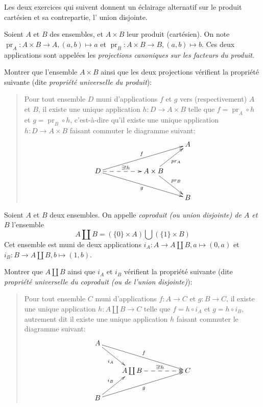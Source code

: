 Les deux exercices qui suivent donnent un éclairage alternatif sur le produit cartésien et sa contrepartie, l' \og union disjointe\fg.

\begin{exercice}
Soient $A$ et $B$ des ensembles, et $ A\times B$ leur produit (cartésien). On note $\operatorname{pr}_A : A\times B \to A, (a,b)\mapsto a$ et $\operatorname{pr}_B : A\times B \to B, (a,b)\mapsto b$. Ces deux applications sont appelées les \emph{projections canoniques sur les facteurs du produit}.

Montrer que l'ensemble $A\times B$ ainsi que les deux projections vérifient la propriété suivante (dite \emph{propriété universelle du produit}):
\begin{quote}
Pour tout ensemble $D$ muni d'applications $f$ et $g$ vers (respectivement) $A$ et $B$, il existe une unique application $h : D\to A\times B$ telle que $f =\operatorname{pr}_A \circ  h$ et $g =\operatorname{pr}_B \circ  h$, c'est-à-dire qu'il existe une unique application $h : D\to A\times B$ faisant commuter le diagramme suivant:
\[ 
\xymatrix{
& & & A\\
D \ar@{-->}[rr]^{\exists !h} \ar[urrr]^{f} \ar[drrr]_{g} & & A\times B \ar[ur]_{pr_A} \ar[dr]^{pr_B}& \\
& & & B
}\]
\end{quote}
\end{exercice}

\begin{exercice}\label{exo-coproduit}
Soient $A$ et $B$ deux ensembles. On appelle \emph{coproduit (ou union disjointe) de $A$ et $B$} l'ensemble
\[
A\coprod B = (\{0\}\times A) \bigcup (\{1\}\times B)
\]
Cet ensemble est muni de deux applications $i_A : A\to A\coprod B, a\mapsto (0,a)$ et  $i_B : B\to A\coprod B, b\mapsto (1,b)$.

Montrer que $A\coprod B$ ainsi que $i_A$ et $i_B$ vérifient la propriété suivante (dite \emph{propriété universelle du coproduit (ou de l'union disjointe)}): 
\begin{quote}
Pour tout ensemble  $C$ muni d'applications $f : A\to C$ et $g : B\to C$, il existe une unique application $h : A\coprod B \to C$ telle que $f = h\circ i_A$ et $g = h\circ i_B$, autrement dit il existe une unique application $h$ faisant commuter le diagramme  suivant:
\[ 
\xymatrix{
A \ar[dr]_{i_A} \ar[drrr]^{f}& & & \\
&  A\coprod B \ar@{-->}[rr]^{\exists !h}  & & C\\
B \ar[ur]^{i_B} \ar[urrr]_{g}& & &
}\]
\end{quote}
\end{exercice}



